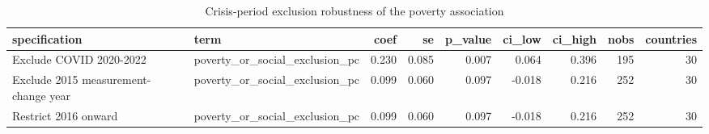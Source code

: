\begin{table}
\caption{Crisis-period exclusion robustness of the poverty association}
\label{tab:regression_crisis_exclusion}
\begin{tabular}{llrrrrrrr}
\toprule
specification & term & coef & se & p\_value & ci\_low & ci\_high & nobs & countries \\
\midrule
Exclude COVID 2020-2022 & poverty\_or\_social\_exclusion\_pc & 0.230 & 0.085 & 0.007 & 0.064 & 0.396 & 195 & 30 \\
Exclude 2015 measurement-change year & poverty\_or\_social\_exclusion\_pc & 0.099 & 0.060 & 0.097 & -0.018 & 0.216 & 252 & 30 \\
Restrict 2016 onward & poverty\_or\_social\_exclusion\_pc & 0.099 & 0.060 & 0.097 & -0.018 & 0.216 & 252 & 30 \\
\bottomrule
\end{tabular}
\end{table}
